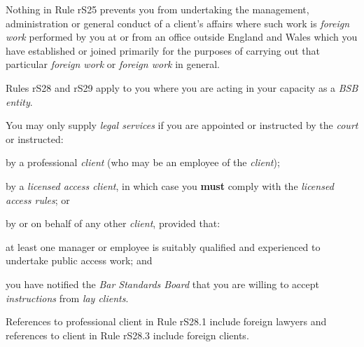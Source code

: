 Nothing in Rule rS25 prevents you from undertaking the management,
administration or general conduct of a client's affairs where such work
is \emph{foreign work} performed by you at or from an office outside
England and Wales which you have established or joined primarily for the
purposes of carrying out that particular \emph{foreign work} or
\emph{foreign work} in general.




Rules rS28 and rS29 apply to you where you are acting in your capacity
as a \emph{BSB entity}.


You may only supply \emph{legal services} if you are appointed or
instructed by the \emph{court} or instructed:\nl\item by a professional \emph{client} (who may be an employee of the
\emph{client});
\item by a \emph{licensed access client}, in which case you \textcolor{myred}{\textbf{must }}comply
with the \emph{licensed access rules}; or
\item by or on behalf of any other \emph{client}, provided that:

\al\item at least one manager or employee is suitably qualified and
experienced to undertake public access work; and

\item you have notified the \emph{Bar Standards Board} that you are willing
to accept \emph{instructions} from \emph{lay clients}.\la
\ln




References to professional client in Rule rS28.1 include foreign lawyers
and references to client in Rule rS28.3 include foreign clients.


